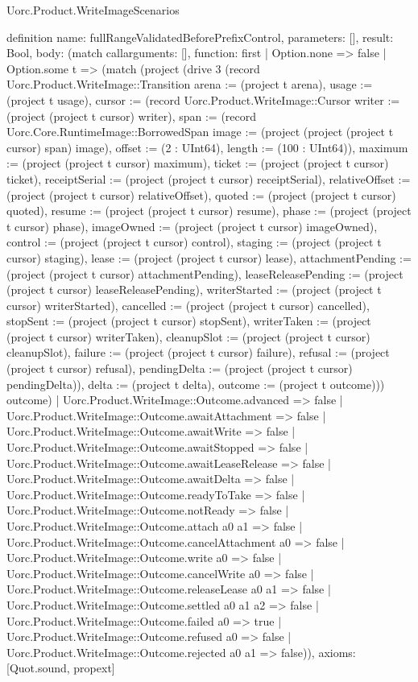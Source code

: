 \begin{lexlean}{Uorc.Product.WriteImageScenarios}
\begin{semanticmodule}
definition{
  name: fullRangeValidatedBeforePrefixControl,
  parameters: [],
  result: Bool,
  body: (match call{arguments: [], function: first}
    | Option.none => false
    | Option.some t => (match (project (drive 3 (record Uorc.Product.WriteImage::Transition {arena := (project t arena), usage := (project t usage), cursor := (record Uorc.Product.WriteImage::Cursor {writer := (project (project t cursor) writer), span := (record Uorc.Core.RuntimeImage::BorrowedSpan {image := (project (project (project t cursor) span) image), offset := (2 : UInt64), length := (100 : UInt64)}), maximum := (project (project t cursor) maximum), ticket := (project (project t cursor) ticket), receiptSerial := (project (project t cursor) receiptSerial), relativeOffset := (project (project t cursor) relativeOffset), quoted := (project (project t cursor) quoted), resume := (project (project t cursor) resume), phase := (project (project t cursor) phase), imageOwned := (project (project t cursor) imageOwned), control := (project (project t cursor) control), staging := (project (project t cursor) staging), lease := (project (project t cursor) lease), attachmentPending := (project (project t cursor) attachmentPending), leaseReleasePending := (project (project t cursor) leaseReleasePending), writerStarted := (project (project t cursor) writerStarted), cancelled := (project (project t cursor) cancelled), stopSent := (project (project t cursor) stopSent), writerTaken := (project (project t cursor) writerTaken), cleanupSlot := (project (project t cursor) cleanupSlot), failure := (project (project t cursor) failure), refusal := (project (project t cursor) refusal), pendingDelta := (project (project t cursor) pendingDelta)}), delta := (project t delta), outcome := (project t outcome)})) outcome)
      | Uorc.Product.WriteImage::Outcome.advanced => false
      | Uorc.Product.WriteImage::Outcome.awaitAttachment => false
      | Uorc.Product.WriteImage::Outcome.awaitWrite => false
      | Uorc.Product.WriteImage::Outcome.awaitStopped => false
      | Uorc.Product.WriteImage::Outcome.awaitLeaseRelease => false
      | Uorc.Product.WriteImage::Outcome.awaitDelta => false
      | Uorc.Product.WriteImage::Outcome.readyToTake => false
      | Uorc.Product.WriteImage::Outcome.notReady => false
      | Uorc.Product.WriteImage::Outcome.attach a0 a1 => false
      | Uorc.Product.WriteImage::Outcome.cancelAttachment a0 => false
      | Uorc.Product.WriteImage::Outcome.write a0 => false
      | Uorc.Product.WriteImage::Outcome.cancelWrite a0 => false
      | Uorc.Product.WriteImage::Outcome.releaseLease a0 a1 => false
      | Uorc.Product.WriteImage::Outcome.settled a0 a1 a2 => false
      | Uorc.Product.WriteImage::Outcome.failed a0 => true
      | Uorc.Product.WriteImage::Outcome.refused a0 => false
      | Uorc.Product.WriteImage::Outcome.rejected a0 a1 => false)),
  axioms: [Quot.sound, propext]
}


\end{semanticmodule}
\end{lexlean}
